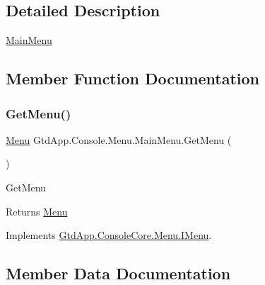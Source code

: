\subsection{Detailed Description}
\mbox{\hyperlink{class_gtd_app_1_1_console_1_1_menu_1_1_main_menu}{Main\+Menu}} 



\subsection{Member Function Documentation}
\mbox{\label{class_gtd_app_1_1_console_1_1_menu_1_1_main_menu_a1b91b88838b55c7d929ac2d41ec97643}} 
\subsubsection{\texorpdfstring{Get\+Menu()}{GetMenu()}}
{\footnotesize\ttfamily \mbox{\hyperlink{class_gtd_app_1_1_console_core_1_1_menu_1_1_menu}{Menu}} Gtd\+App.\+Console.\+Menu.\+Main\+Menu.\+Get\+Menu (\begin{DoxyParamCaption}{ }\end{DoxyParamCaption})}



Get\+Menu 

\begin{DoxyReturn}{Returns}
\mbox{\hyperlink{namespace_gtd_app_1_1_console_1_1_menu}{Menu}}
\end{DoxyReturn}


Implements \mbox{\hyperlink{interface_gtd_app_1_1_console_core_1_1_menu_1_1_i_menu_a3a5ae5283f448b4aeb0d4d6404ebebab}{Gtd\+App.\+Console\+Core.\+Menu.\+I\+Menu}}.



\subsection{Member Data Documentation}
\mbox{\label{class_gtd_app_1_1_console_1_1_menu_1_1_main_menu_a14921f59e9b211ffe3eb79a48e150bcb}} 
